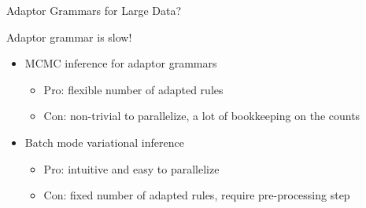 \begin{frame}{Adaptor Grammars for Large Data?}
  \vspace{-1mm}
  \begin{block}{Adaptor grammar is slow!}
    \begin{itemize}
    \item MCMC inference for adaptor grammars~\citep{johnson-06}
      \begin{itemize}
      \item Pro: flexible number of adapted rules
      \item Con: non-trivial to parallelize, a lot of bookkeeping on
        the counts
      \end{itemize}
    \item Batch mode variational inference~\citep{cohen-10}
      \begin{itemize}
      \item Pro: intuitive and easy to parallelize
      \item Con: fixed number of adapted rules, require pre-processing step
      \end{itemize}
    \end{itemize}
  \end{block}


\end{frame}
